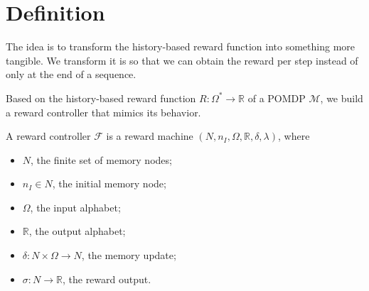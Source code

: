 \section{Definition}


The idea is to transform the history-based reward function into something more tangible. We transform it is so that we can obtain the reward per step instead of only at the end of a sequence.


Based on the history-based reward function $R:\Omega^*\to\mathbb{R}$ of a POMDP $\mathcal{M}$, we build a reward controller that mimics its behavior.



\begin{definition}
	A reward controller $\mathcal{F}$ is a reward machine $(N,n_I, \Omega, \mathbb{R}, \delta, \lambda)$, where
	\begin{itemize}
		\item $N$, the finite set of memory nodes;
		\item $n_I\in N$, the initial memory node;
		\item $\Omega$, the input alphabet;
		\item $\mathbb{R}$, the output alphabet;
		\item $\delta: N \times \Omega \to N$, the memory update;
		\item $\sigma: N \to \mathbb{R}$, the reward output. 
	\end{itemize}
\end{definition}







